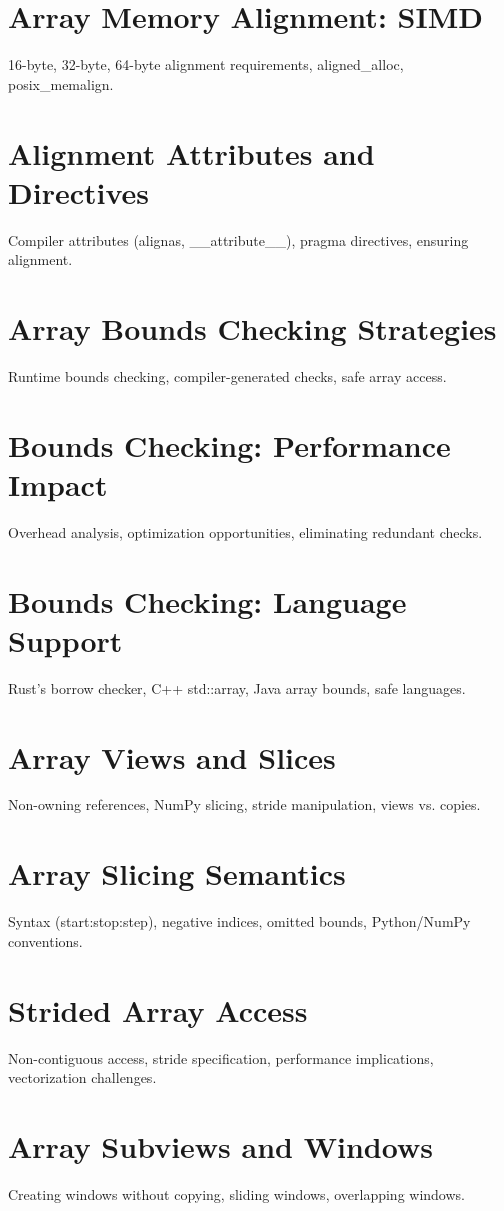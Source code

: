 \chapter{Array Memory Alignment: SIMD}
16-byte, 32-byte, 64-byte alignment requirements, aligned\_alloc, posix\_memalign.

\chapter{Alignment Attributes and Directives}
Compiler attributes (alignas, \_\_attribute\_\_), pragma directives, ensuring alignment.

\chapter{Array Bounds Checking Strategies}
Runtime bounds checking, compiler-generated checks, safe array access.

\chapter{Bounds Checking: Performance Impact}
Overhead analysis, optimization opportunities, eliminating redundant checks.

\chapter{Bounds Checking: Language Support}
Rust's borrow checker, C++ std::array, Java array bounds, safe languages.

\chapter{Array Views and Slices}
Non-owning references, NumPy slicing, stride manipulation, views vs. copies.

\chapter{Array Slicing Semantics}
Syntax (start:stop:step), negative indices, omitted bounds, Python/NumPy conventions.

\chapter{Strided Array Access}
Non-contiguous access, stride specification, performance implications, vectorization challenges.

\chapter{Array Subviews and Windows}
Creating windows without copying, sliding windows, overlapping windows.

